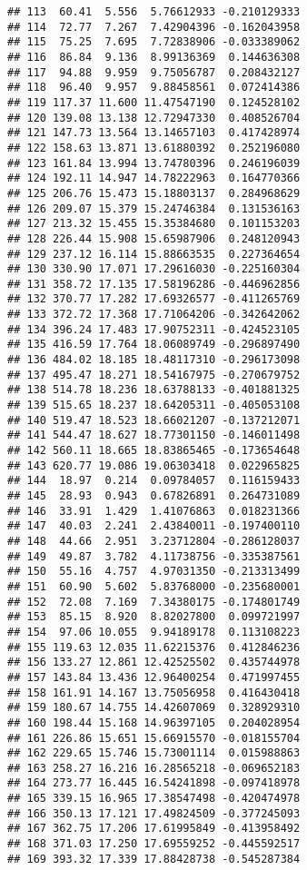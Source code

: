 \documentclass[]{book}
\theoremstyle{definition}
\theoremstyle{definition}
\theoremstyle{definition}
\theoremstyle{remark}
\begin{document}
\begin{verbatim}
## 113  60.41  5.556  5.76612933 -0.210129333
## 114  72.77  7.267  7.42904396 -0.162043958
## 115  75.25  7.695  7.72838906 -0.033389062
## 116  86.84  9.136  8.99136369  0.144636308
## 117  94.88  9.959  9.75056787  0.208432127
## 118  96.40  9.957  9.88458561  0.072414386
## 119 117.37 11.600 11.47547190  0.124528102
## 120 139.08 13.138 12.72947330  0.408526704
## 121 147.73 13.564 13.14657103  0.417428974
## 122 158.63 13.871 13.61880392  0.252196080
## 123 161.84 13.994 13.74780396  0.246196039
## 124 192.11 14.947 14.78222963  0.164770366
## 125 206.76 15.473 15.18803137  0.284968629
## 126 209.07 15.379 15.24746384  0.131536163
## 127 213.32 15.455 15.35384680  0.101153203
## 128 226.44 15.908 15.65987906  0.248120943
## 129 237.12 16.114 15.88663535  0.227364654
## 130 330.90 17.071 17.29616030 -0.225160304
## 131 358.72 17.135 17.58196286 -0.446962856
## 132 370.77 17.282 17.69326577 -0.411265769
## 133 372.72 17.368 17.71064206 -0.342642062
## 134 396.24 17.483 17.90752311 -0.424523105
## 135 416.59 17.764 18.06089749 -0.296897490
## 136 484.02 18.185 18.48117310 -0.296173098
## 137 495.47 18.271 18.54167975 -0.270679752
## 138 514.78 18.236 18.63788133 -0.401881325
## 139 515.65 18.237 18.64205311 -0.405053108
## 140 519.47 18.523 18.66021207 -0.137212071
## 141 544.47 18.627 18.77301150 -0.146011498
## 142 560.11 18.665 18.83865465 -0.173654648
## 143 620.77 19.086 19.06303418  0.022965825
## 144  18.97  0.214  0.09784057  0.116159433
## 145  28.93  0.943  0.67826891  0.264731089
## 146  33.91  1.429  1.41076863  0.018231366
## 147  40.03  2.241  2.43840011 -0.197400110
## 148  44.66  2.951  3.23712804 -0.286128037
## 149  49.87  3.782  4.11738756 -0.335387561
## 150  55.16  4.757  4.97031350 -0.213313499
## 151  60.90  5.602  5.83768000 -0.235680001
## 152  72.08  7.169  7.34380175 -0.174801749
## 153  85.15  8.920  8.82027800  0.099721997
## 154  97.06 10.055  9.94189178  0.113108223
## 155 119.63 12.035 11.62215376  0.412846236
## 156 133.27 12.861 12.42525502  0.435744978
## 157 143.84 13.436 12.96400254  0.471997455
## 158 161.91 14.167 13.75056958  0.416430418
## 159 180.67 14.755 14.42607069  0.328929310
## 160 198.44 15.168 14.96397105  0.204028954
## 161 226.86 15.651 15.66915570 -0.018155704
## 162 229.65 15.746 15.73001114  0.015988863
## 163 258.27 16.216 16.28565218 -0.069652183
## 164 273.77 16.445 16.54241898 -0.097418978
## 165 339.15 16.965 17.38547498 -0.420474978
## 166 350.13 17.121 17.49824509 -0.377245093
## 167 362.75 17.206 17.61995849 -0.413958492
## 168 371.03 17.250 17.69559252 -0.445592517
## 169 393.32 17.339 17.88428738 -0.545287384

\end{verbatim}
\end{document}
